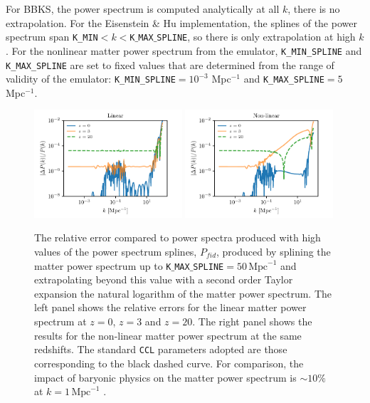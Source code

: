 \documentclass[\docopts]{\docclass}
\newcommand{\ccl}{{\tt CCL}\xspace}
\begin{document}
For BBKS, the power spectrum is computed analytically at all $k$, there is no
extrapolation. For the Eisenstein \& Hu implementation, the splines of the power
spectrum span {\tt K\_MIN}$<k<${\tt K$\_$MAX$\_$SPLINE}, so there is only
extrapolation at high $k$. For the nonlinear matter power spectrum from the
emulator, {\tt K\_MIN\_SPLINE} and {\tt K\_MAX\_SPLINE} are set to fixed values
that are determined from the range of validity of the emulator:
{\tt K\_MIN\_SPLINE}$=10^{-3}$ Mpc$^{-1}$ and {\tt K\_MAX\_SPLINE}$=5$ Mpc$^{-1}$.


\begin{figure}
\centering
  \includegraphics[width=0.49\textwidth]{splacc_power_lin}
  \includegraphics[width=0.49\textwidth]{splacc_power_nl}
\caption{
    The relative error compared to power spectra produced with high values of the
    power spectrum splines, $P_{fid}$, produced by splining the matter power
    spectrum up to {\tt K$\_$MAX$\_$SPLINE}$=50\,\text{Mpc}^{-1}$ and extrapolating
    beyond this value with a second order Taylor expansion the natural logarithm of
    the matter power spectrum. The left panel shows the relative errors for the
    linear matter power spectrum at $z=0$, $z=3$ and $z=20$. The right panel shows
    the results for the non-linear matter power spectrum at the same redshifts. The
    standard \ccl parameters adopted are those corresponding to the black dashed
    curve. For comparison, the impact of baryonic physics on the matter power
    spectrum is $\sim 10\%$ at $k=1\,\text{Mpc}^{-1}$ \citep{Schneider15}.}
\label{fig:NLextrapol}
\end{figure}
\end{document}
